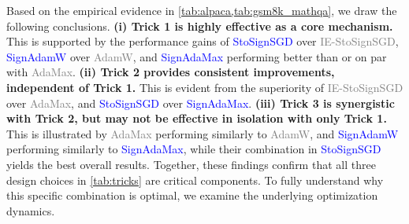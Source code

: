 \documentclass{article}
\begin{document}
Based on the empirical evidence in \cref{tab:alpaca,tab:gsm8k_mathqa}, we draw the following conclusions. \textbf{(i) Trick 1 is highly effective as a core mechanism.} This is supported by the performance gains of \textcolor{blue}{StoSignSGD} over \textcolor{gray}{IE-StoSignSGD}, \textcolor{blue}{SignAdamW} over \textcolor{gray}{AdamW}, and \textcolor{blue}{SignAdaMax} performing better than or on par with \textcolor{gray}{AdaMax}. \textbf{(ii) Trick 2 provides consistent improvements, independent of Trick 1.} This is evident from the superiority of \textcolor{gray}{IE-StoSignSGD} over \textcolor{gray}{AdaMax}, and \textcolor{blue}{StoSignSGD} over \textcolor{blue}{SignAdaMax}. \textbf{(iii) Trick 3 is synergistic with Trick 2, but may not be effective in isolation with only Trick 1.} This is illustrated by \textcolor{gray}{AdaMax} performing similarly to \textcolor{gray}{AdamW}, and \textcolor{blue}{SignAdamW} performing similarly to \textcolor{blue}{SignAdaMax}, while their combination in \textcolor{blue}{StoSignSGD} yields the best overall results. Together, these findings confirm that all three design choices in \cref{tab:tricks} are critical components. To fully understand why this specific combination is optimal, we examine the underlying optimization dynamics.
\end{document}
